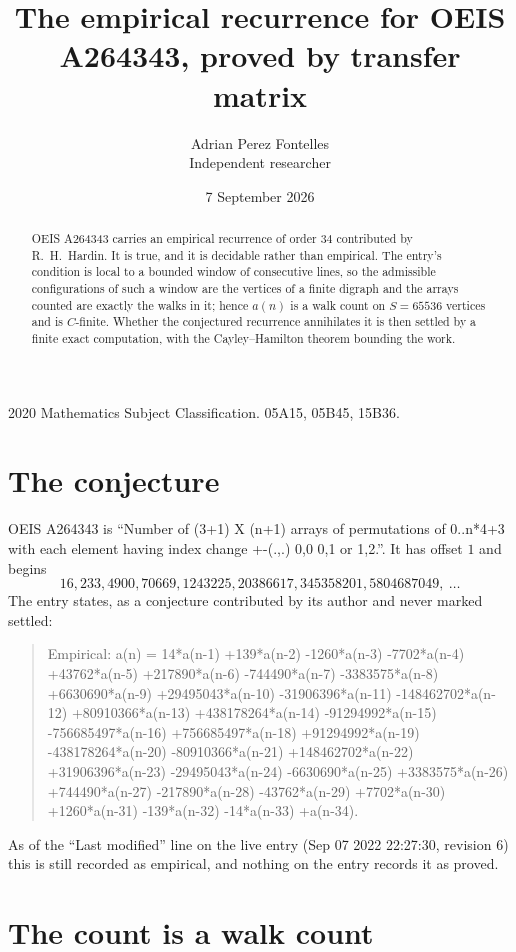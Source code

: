 \documentclass[11pt,a4paper]{article}
\title{The empirical recurrence for OEIS A264343, proved by transfer matrix}
\author{Adrian Perez Fontelles\\ \small Independent researcher}
\date{7 September 2026}
\theoremstyle{plain}
\theoremstyle{definition}
\begin{document}
\maketitle

\begin{abstract}
OEIS A264343 carries an empirical recurrence of order $34$ contributed by R.~H.~Hardin. It is
true, and it is decidable rather than empirical. The entry's condition is local to a bounded window of consecutive lines, so
the admissible configurations of such a window are the vertices of a finite digraph and the
arrays counted are exactly the walks in it; hence $a(n)$ is a walk count on $S=65536$ vertices
and is $C$-finite. Whether the conjectured recurrence annihilates it is then settled by a
finite exact computation, with the Cayley--Hamilton theorem bounding the work.
\end{abstract}

\noindent\small 2020 Mathematics Subject Classification. 05A15, 05B45, 15B36.\normalsize

\section{The conjecture}

OEIS A264343 is ``Number of (3+1) X (n+1) arrays of permutations of 0..n*4+3 with each element having index change +-(.,.) 0,0 0,1 or 1,2.''. It has offset $1$ and begins
\[
16, 233, 4900, 70669, 1243225, 20386617, 345358201, 5804687049,\ \dots
\]
The entry states, as a conjecture contributed by its author and never marked settled:
\begin{quote}
Empirical: a(n) = 14*a(n-1) +139*a(n-2) -1260*a(n-3) -7702*a(n-4) +43762*a(n-5) +217890*a(n-6) -744490*a(n-7) -3383575*a(n-8) +6630690*a(n-9) +29495043*a(n-10) -31906396*a(n-11) -148462702*a(n-12) +80910366*a(n-13) +438178264*a(n-14) -91294992*a(n-15) -756685497*a(n-16) +756685497*a(n-18) +91294992*a(n-19) -438178264*a(n-20) -80910366*a(n-21) +148462702*a(n-22) +31906396*a(n-23) -29495043*a(n-24) -6630690*a(n-25) +3383575*a(n-26) +744490*a(n-27) -217890*a(n-28) -43762*a(n-29) +7702*a(n-30) +1260*a(n-31) -139*a(n-32) -14*a(n-33) +a(n-34).
\end{quote}
As of the ``Last modified'' line on the live entry (Sep 07 2022 22:27:30, revision 6) this is still
recorded as empirical, and nothing on the entry records it as proved.

\section{The count is a walk count}
\end{document}
